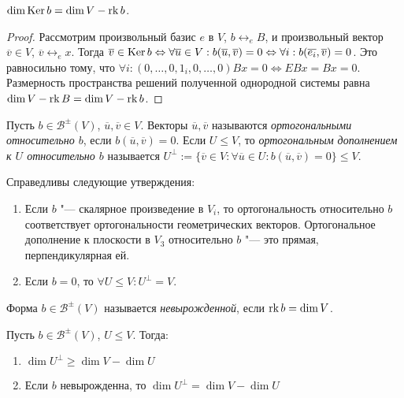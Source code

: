\begin{theorem}
	$\dim{\operatorname{Ker}{b}} = \dim{V} - \operatorname{rk}{b}$.
\end{theorem}

\begin{proof}
	Рассмотрим произвольный базис $e$ в $V$, $b \leftrightarrow_e B$, и произвольный вектор $\overline{v} \in V$, $\overline{v} \leftrightarrow_e x$. Тогда $\overline{v} \in \ke{b} \Leftrightarrow \forall \overline{u} \in V: b(\overline{u}, \overline{v}) \hm{=} 0 \Leftrightarrow \forall i: b(\overline{e_i}, \overline{v}) = 0$. Это равносильно тому, что $\forall i: (0, \dots, 0, 1_i, 0, \dots, 0)Bx = 0 \Leftrightarrow EBx = Bx = 0$. Размерность пространства решений полученной однородной системы равна $\dim{V} - \operatorname{rk}{B} = \dim{V} - \operatorname{rk}{b}$.
\end{proof}

\begin{definition}
	Пусть $b \in \mathcal{B}^\pm(V)$, $\overline{u}, \overline{v} \in {V}$. Векторы $\overline{u}, \overline{v}$ называются \textit{ортогональными относительно $b$}, если $b(\overline{u}, \overline{v}) = 0$. Если $U \le V$, то \textit{ортогональным дополнением к $U$ относительно $b$} называется $U^\perp := \{\overline{v} \in V: \forall \overline{u} \in U: b(\overline{u}, \overline{v}) = 0\} \le V$.
\end{definition}

\begin{example} Справедливы следующие утверждения:
	\begin{enumerate}
		\item Если $b$ "--- скалярное произведение в $V_i$, то ортогональность относительно $b$ соответствует ортогональности геометрических векторов. Ортогональное дополнение к плоскости в $V_3$ относительно $b$ "--- это прямая, перпендикулярная ей.
		\item Если $b = 0$, то $\forall U \le V: U^\perp = V$.
	\end{enumerate}
\end{example}

\begin{definition}
	Форма $b \in \mathcal{B}^\pm(V)$ называется \textit{невырожденной}, если $\operatorname{rk}{b} = \dim{V}$.
\end{definition}

\begin{theorem}Пусть $b \in \mathcal{B}^\pm(V)$, $U \le V$. Тогда:
	\begin{enumerate}
		\item $\dim{U^\perp} \ge \dim{V} - \dim{U}$
		\item Если $b$ невырожденна, то $\dim{U^\perp} = \dim{V} - \dim{U}$
	\end{enumerate}
\end{theorem}

